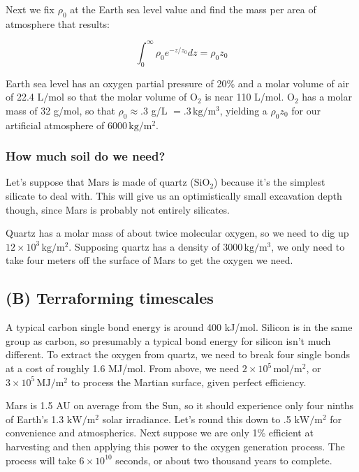 \documentclass[12pt]{article}
\begin{document}
Next we fix \( \rho_0 \) at the Earth sea level value and find the mass per area of atmosphere that results:

\[\int_0^\infty \rho_0 e^{-z/z_0}dz = \rho_0 z_0
\]

Earth sea level has an oxygen partial pressure of 20\% and a molar volume of air of 22.4 L/mol so that the molar volume of \(\mathrm{O}_2\) is near 110 L/mol. \(\mathrm{O}_2\) has a molar mass of 32 g/mol, so that \(\rho_0 \approx .3\) g/L \( = .3 \,\mathrm{kg}/\mathrm{m}^3\), yielding a \(\rho_0 z_0\) for our artificial atmosphere of \( 6000 \,\mathrm{kg}/\mathrm{m}^2\).


\subsubsection{How much soil do we need?}

Let's suppose that Mars is made of quartz (\(\mathrm{SiO_2}\)) because it's the simplest silicate to deal with. This will give us an optimistically small excavation depth though, since Mars is probably not entirely silicates.

Quartz has a molar mass of about twice molecular oxygen, so we need to dig up  \( 12 \times 10^{3} \,\mathrm{kg}/\mathrm{m}^2\). Supposing quartz has a density of \(3000 \,\mathrm{kg}/\mathrm{m}^3\), we only need to take four meters off the surface of Mars to get the oxygen we need.

\subsection{(B) Terraforming timescales}

A typical carbon single bond energy is around 400 kJ/mol. Silicon is in the same group as carbon, so presumably a typical bond energy for silicon isn't much different. To extract the oxygen from  quartz, we need to break four single bonds at a cost of roughly 1.6 MJ/mol. From above, we need \(2 \times 10^{5} \,\mathrm{mol}/\mathrm{m^2}\), or \(3 \times 10^{5} \,\mathrm{MJ}/\mathrm{m^2}\) to process the Martian surface, given perfect efficiency.

Mars is 1.5 AU on average from the Sun, so it should experience only four ninths of Earth's 1.3 \(\mathrm{kW}/\mathrm{m}^2\) solar irradiance. Let's round this down to .5 \(\mathrm{kW}/\mathrm{m}^2\) for convenience and atmospherics.
Next suppose we are only 1\% efficient at harvesting and then applying this power to the oxygen generation process. The process will take \(6 \times 10^{10}\) seconds, or about two thousand years to complete.
\end{document}
